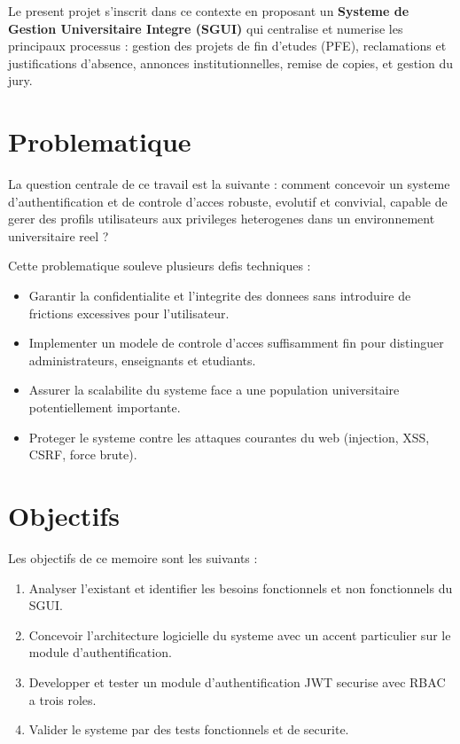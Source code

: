 \documentclass[12pt,a4paper]{report}
\begin{document}
Le present projet s'inscrit dans ce contexte en proposant un \textbf{Systeme
de Gestion Universitaire Integre (SGUI)} qui centralise et numerise les
principaux processus : gestion des projets de fin d'etudes (PFE),
reclamations et justifications d'absence, annonces institutionnelles,
remise de copies, et gestion du jury.

\section*{Problematique}

La question centrale de ce travail est la suivante : comment concevoir un
systeme d'authentification et de controle d'acces robuste, evolutif et
convivial, capable de gerer des profils utilisateurs aux privileges
heterogenes dans un environnement universitaire reel ?

Cette problematique souleve plusieurs defis techniques :
\begin{itemize}
  \item Garantir la confidentialite et l'integrite des donnees sans
        introduire de frictions excessives pour l'utilisateur.
  \item Implementer un modele de controle d'acces suffisamment fin pour
        distinguer administrateurs, enseignants et etudiants.
  \item Assurer la scalabilite du systeme face a une population
        universitaire potentiellement importante.
  \item Proteger le systeme contre les attaques courantes du web
        (injection, XSS, CSRF, force brute).
\end{itemize}

\section*{Objectifs}

Les objectifs de ce memoire sont les suivants :
\begin{enumerate}
  \item Analyser l'existant et identifier les besoins fonctionnels et non
        fonctionnels du SGUI.
  \item Concevoir l'architecture logicielle du systeme avec un accent
        particulier sur le module d'authentification.
  \item Developper et tester un module d'authentification JWT securise
        avec RBAC a trois roles.
  \item Valider le systeme par des tests fonctionnels et de securite.
\end{enumerate}
\end{document}
